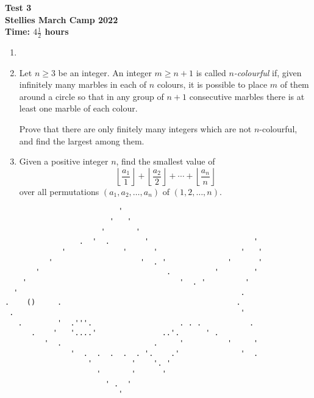 \documentclass{article}
\begin{document}
\thispagestyle{empty}

\begin{center}
  \textbf{\Large Test 3}
  \\ \vspace{1em}
  \textbf{\large Stellies March Camp 2022}
  \\ \vspace{1em}
  \textbf{\large Time: $4\frac{1}{2}$ hours}
\end{center}

\vspace{24pt}

\begin{enumerate}[itemsep=12pt]

\item %


\item %
Let $n \geq 3$ be an integer.
An integer $m \geq n+1$ is called \emph{$n$-colourful} if, given infinitely many marbles in each of $n$ colours, it is possible to place $m$ of them around a circle so that in any group of $n+1$ consecutive marbles there is at least one marble of each colour.

Prove that there are only finitely many integers which are not $n$-colourful, and find the largest among them.

\item %
\newcommand{\floorf}[2]{\left\lfloor\frac{#1}{#2}\right\rfloor}
Given a positive integer $n$, find the smallest value of
\[ \floorf{a_1}{1} +\floorf{a_2}{2} +\dotsb +\floorf{a_n}{n} \]
over all permutations $(a_1, a_2, \dotsc, a_n)$ of $(1, 2, \dotsc, n)$.

\end{enumerate}

\vfill
\centering \small
\begin{BVerbatim}
                          '
                        '   '
                      '       '
                 .  '  .        '                        '
             '             '      '                   '   '
          '                    '  . '              '      '
       '                             .          '        '
    '                                   '  . '         '
  '                                                   .
.    ()     .                                        .
 .                                                    '
   .        '  .'''.                    . . .           .
      .    '   '....'               ..'.      ' .
         '  .                     .     '          '     '
               '  .  .  .  .  . '.    .'              '  .
                   '         '    '. '
                     '       '      '
                       ' .  '
                          '
\end{BVerbatim}
\end{document}
